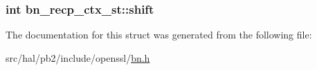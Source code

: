 \subsubsection[{\texorpdfstring{shift}{shift}}]{\setlength{\rightskip}{0pt plus 5cm}int bn\+\_\+recp\+\_\+ctx\+\_\+st\+::shift}\hypertarget{structbn__recp__ctx__st_ac74357f903a13ec4404d8e0a2d752ec7}{}\label{structbn__recp__ctx__st_ac74357f903a13ec4404d8e0a2d752ec7}


The documentation for this struct was generated from the following file\+:\begin{DoxyCompactItemize}
\item 
src/hal/pb2/include/openssl/\hyperlink{bn_8h}{bn.\+h}\end{DoxyCompactItemize}
